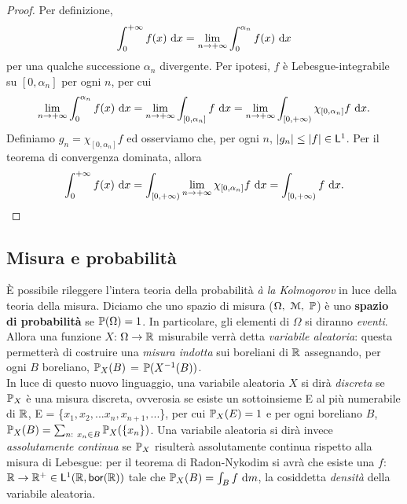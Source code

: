 \documentclass[Completo.tex]{subfiles}
\begin{document}
\begin{proof}
	Per definizione,
	\begin{equation*}
	\int_{0}^{+\infty} f(x) \ \mathrm{d}x = \lim_{n \rightarrow +\infty} \int_{0}^{\alpha_n} f(x) \ \mathrm{d}x
	\end{equation*}
	per una qualche successione $\alpha_n$ divergente. Per ipotesi, $f$ è Lebesgue-integrabile su $[0, \alpha_n]$ per ogni $n$, per cui
	\begin{equation*}
	\lim_{n \rightarrow +\infty} \int_{0}^{\alpha_n} f(x) \ \mathrm{d}x = \lim_{n \rightarrow +\infty} \int_{[0, \alpha_n]} f \ \mathrm{d}x = \lim_{n \rightarrow +\infty} \int_{[0, +\infty)} \chi_{[0, \alpha_n]} f \ \mathrm{d}x.
	\end{equation*}
	Definiamo $g_n = \chi_{[0, \alpha_n]}f$ ed osserviamo che, per ogni $n$, $\vert g_n \vert \leq \vert f \vert \in \sf[L]^1$. Per il teorema di convergenza dominata, allora
	\begin{equation*}
	\int_{0}^{+\infty} f(x) \ \mathrm{d}x = \int_{[0,+\infty)} \lim_{n \ra +\infty}\chi_{[0, \alpha_n]}f \ \mathrm{d}x = \int_{[0, +\infty)} f \ \mathrm{d}x.
	\end{equation*}
\end{proof}
\subsection{Misura e probabilità}
È possibile rileggere l'intera teoria della probabilità \textit{à la Kolmogorov} in luce della teoria della misura. Diciamo che uno spazio di misura ($\Omega, \ \eu[M], \ \bb[P]$) è uno \textbf{spazio di probabilità} se $\bb[P](\Omega) = 1$. In particolare, gli elementi di $\Omega$ si diranno \textit{eventi}. Allora una funzione $X$: $\Omega \ra \bb[R]$ misurabile verrà detta \textit{variabile aleatoria}: questa permetterà di costruire una \textit{misura indotta} sui boreliani di $\bb[R]$ assegnando, per ogni $B$ boreliano, $\bb[P]_X(B)$ = $\bb[P](X^{-1}(B))$. \\
In luce di questo nuovo linguaggio, una variabile aleatoria $X$ si dirà \textit{discreta} se $\bb[P]_X$ è una misura discreta, ovverosia se esiste un sottoinsieme E al più numerabile di $\bb[R]$, E = \{$x_1, x_2, ... x_{n}, x_{n+1}, ...$\}, per cui $\bb[P]_X(E) = 1$ e per ogni boreliano $B$, $\bb[P]_X(B) = \sum_{n: \ x_n \in B} \bb[P]_X(\{x_n\})$. Una variabile aleatoria si dirà invece \textit{assolutamente continua} se $\bb[P]_X$ risulterà assolutamente continua rispetto alla misura di Lebesgue: per il teorema di Radon-Nykodim si avrà che esiste una $f$: $\bb[R] \ra \bb[R]^{+} \in \sf[L]^1(\bb[R], \sf[bor](\bb[R]))$ tale che $\bb[P]_X(B) = \int_B f \ \mathrm{d}m$, la cosiddetta \textit{densità} della variabile aleatoria.
\end{document}
